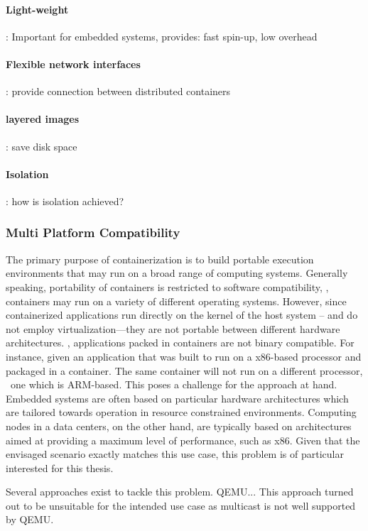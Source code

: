 \paragraph{Light-weight}: Important for embedded systems, provides: fast spin-up, low overhead

\paragraph{Flexible network interfaces}: provide connection between distributed containers

\paragraph{layered images}: save disk space

\paragraph{Isolation}: how is isolation achieved?


\subsubsection{Multi Platform Compatibility} 
The primary purpose of containerization is to build portable execution environments that may run on a broad range of computing systems. Generally speaking, portability of containers is restricted to software compatibility, \ie , containers may run on a variety of different operating systems. However, since containerized applications run directly on the kernel of the host system -- and do not employ virtualization---they are not portable between different hardware architectures. \Ie , applications packed in containers are not binary compatible. For instance, given an application that was built to run on a x86-based processor and packaged in a container. The same container will not run on a different processor, \eg\ one which is ARM-based. This poses a challenge for the approach at hand. Embedded systems are often based on particular hardware architectures which are tailored towards operation in resource constrained environments. Computing nodes in a data centers, on the other hand, are typically based on architectures aimed at providing a maximum level of performance, such as x86. Given that the envisaged scenario exactly matches this use case, this problem is of particular interested for this thesis.

Several approaches exist to tackle this problem. QEMU... This approach turned out to be unsuitable for the intended use case as multicast is not well supported by QEMU.


